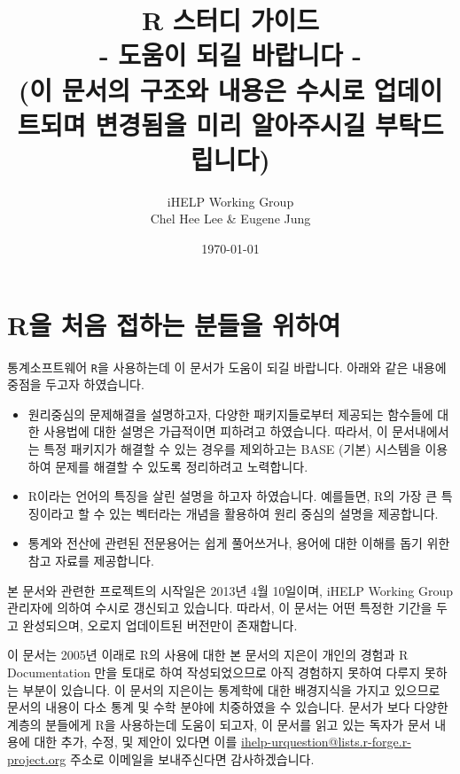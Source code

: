 \documentclass{book}
\title{R 스터디 가이드 \\
   - 도움이 되길 바랍니다 - \\ 
   (이 문서의 구조와 내용은 수시로 업데이트되며 변경됨을 미리 알아주시길 부탁드립니다)
 }
\author{iHELP Working Group \\ Chel Hee Lee \& Eugene Jung }
\date{\today}
\begin{document}
\maketitle

%
%
%
%

\part{R을 처음 접하는 분들을 위하여}


통계소프트웨어 \texttt{R}을 사용하는데 이 문서가 도움이 되길 바랍니다. 
아래와 같은 내용에 중점을 두고자 하였습니다. 

\begin{itemize}
\item 원리중심의 문제해결을 설명하고자, 다양한 패키지들로부터 제공되는 함수들에 대한 사용법에 대한 설명은 가급적이면 피하려고 하였습니다.
따라서, 이 문서내에서는 특정 패키지가 해결할 수 있는 경우를 제외하고는 BASE (기본) 시스템을 이용하여 문제를 해결할 수 있도록 정리하려고 노력합니다.

\item R이라는 언어의 특징을 살린 설명을 하고자 하였습니다.  
예를들면, R의 가장 큰 특징이라고 할 수 있는 벡터라는 개념을 활용하여 원리 중심의 설명을 제공합니다. 

\item 통계와 전산에 관련된 전문용어는 쉽게 풀어쓰거나, 용어에 대한 이해를 돕기 위한 참고 자료를 제공합니다. 
\end{itemize}

본 문서와 관련한 프로젝트의 시작일은 2013년 4월 10일이며, iHELP Working Group 관리자에 의하여 수시로 갱신되고 있습니다.
따라서, 이 문서는 어떤 특정한 기간을 두고 완성되으며, 오로지 업데이트된 버전만이 존재합니다.

이 문서는 2005년 이래로 R의 사용에 대한 본 문서의 지은이 개인의 경험과 R Documentation 만을 토대로 하여 작성되었으므로 아직 경험하지 못하여 다루지 못하는 부분이 있습니다.
이 문서의 지은이는 통계학에 대한 
배경지식을 가지고 있으므로 문서의 내용이 다소 통계 및 수학 분야에 치중하였을 수 있습니다.
문서가 보다 다양한 계층의 분들에게 R을 사용하는데 도움이 되고자, 이 문서를 읽고 있는 독자가 문서 내용에 대한 추가, 수정, 및 제안이 있다면 이를 \href{mailto:ihelp-urquestion@lists.r-forge.r-project.org}{ihelp-urquestion@lists.r-forge.r-project.org} 주소로 이메일을 보내주신다면 감사하겠습니다. 
\end{document}
